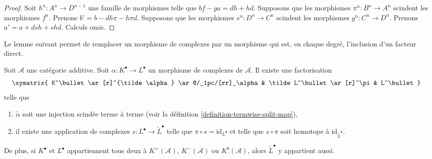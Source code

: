 \begin{proof}
Soit $h^n : A^n \to D^{n - 1}$ une famille de morphismes telle que
$bf - ga = dh + hd$. Supposons que les morphismes $\pi^n : B^n \to A^n$
scindent les morphismes $f^n$.
Prenons $b' = b - dh\pi - h\pi d$.
Supposons que les morphismes $s^n : D^n \to C^n$ scindent les morphismes
$g^n : C^n \to D^n$. Prenons $a' = a + dsh + shd$.
Calculs omis.
\end{proof}

\noindent
Le lemme suivant permet de remplacer un morphisme de complexes par un morphisme
qui est, en chaque degré, l'inclusion d'un facteur direct.

\begin{lemma}
\label{lemma-make-injective}
Soit $\mathcal{A}$ une catégorie additive.
Soit $\alpha : K^\bullet \to L^\bullet$ un morphisme de complexes de
$\mathcal{A}$. Il existe une factorisation
$$
\xymatrix{
K^\bullet \ar[r]^{\tilde \alpha} \ar@/_1pc/[rr]_\alpha &
\tilde L^\bullet \ar[r]^\pi &
L^\bullet
}
$$
telle que
\begin{enumerate}
\item $\tilde \alpha$ soit une injection scindée terme à terme (voir la
définition \ref{definition-termwise-split-map}),
\item il existe une application de complexes $s : L^\bullet \to \tilde L^\bullet$
telle que $\pi \circ s = \text{id}_{L^\bullet}$ et telle que $s \circ \pi$ soit
homotope à $\text{id}_{\tilde L^\bullet}$.
\end{enumerate}
De plus, si $K^\bullet$ et $L^\bullet$ appartiennent tous deux à
$K^{+}(\mathcal{A})$, $K^{-}(\mathcal{A})$ ou $K^b(\mathcal{A})$, alors
$\tilde L^\bullet$ y appartient aussi.
\end{lemma}

